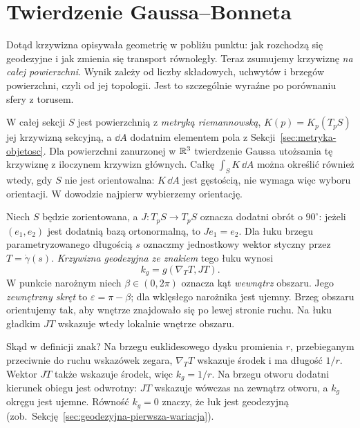 \section{Twierdzenie Gaussa--Bonneta}
\label{sec:gauss-bonnet}

Dotąd krzywizna opisywała geometrię w pobliżu punktu:
jak rozchodzą się geodezyjne i jak zmienia się transport
równoległy. Teraz zsumujemy krzywiznę \emph{na całej
powierzchni}. Wynik zależy od liczby składowych, uchwytów
i brzegów powierzchni, czyli od jej topologii. Jest to
szczególnie wyraźne po porównaniu sfery z torusem.

W całej sekcji $S$ jest powierzchnią z \emph{metryką
riemannowską}, $K(p)=K_p(T_pS)$ jej krzywizną sekcyjną,
a $\dd A$ dodatnim elementem
pola z Sekcji~\ref{sec:metryka-objetosc}. Dla powierzchni
zanurzonej w $\mathbb{R}^3$ twierdzenie Gaussa utożsamia tę
krzywiznę z iloczynem krzywizn głównych.
Całkę $\int_S K\,\dd A$ można określić również wtedy,
gdy $S$ nie jest orientowalna: $K\,\dd A$ jest gęstością,
nie wymaga więc wyboru orientacji. W dowodzie najpierw
wybierzemy orientację.

\begin{definicja}
\label{def:krzywizna-geodezyjna}
Niech $S$ będzie zorientowana, a $J:T_pS\to T_pS$
oznacza dodatni obrót o $90^\circ$: jeżeli $(e_1,e_2)$
jest dodatnią bazą ortonormalną, to $Je_1=e_2$.
Dla łuku brzegu parametryzowanego długością $s$ oznaczmy
jednostkowy wektor styczny przez $T=\dot\gamma(s)$.
\emph{Krzywizna geodezyjna ze znakiem} tego łuku wynosi
\begin{equation}\label{eq:kg-def}
 k_g=g(\nabla_TT,JT).
\end{equation}
W punkcie narożnym niech $\beta\in(0,2\pi)$ oznacza
kąt \emph{wewnątrz} obszaru. Jego \emph{zewnętrzny skręt}
to $\varepsilon=\pi-\beta$; dla wklęsłego narożnika
jest ujemny. Brzeg obszaru orientujemy tak, aby wnętrze
znajdowało się po lewej stronie ruchu. Na łuku gładkim
$JT$ wskazuje wtedy lokalnie wnętrze obszaru.
\end{definicja}

Skąd w definicji znak? Na brzegu euklidesowego dysku
promienia $r$, przebieganym przeciwnie do ruchu wskazówek
zegara, $\nabla_TT$ wskazuje środek i ma długość $1/r$.
Wektor $JT$ także wskazuje środek, więc $k_g=1/r$.
Na brzegu otworu dodatni kierunek obiegu jest odwrotny:
$JT$ wskazuje wówczas na zewnątrz otworu, a $k_g$
okręgu jest ujemne. Równość $k_g=0$ znaczy, że łuk
jest geodezyjną (zob.\ Sekcję~\ref{sec:geodezyjna-pierwsza-wariacja}).

